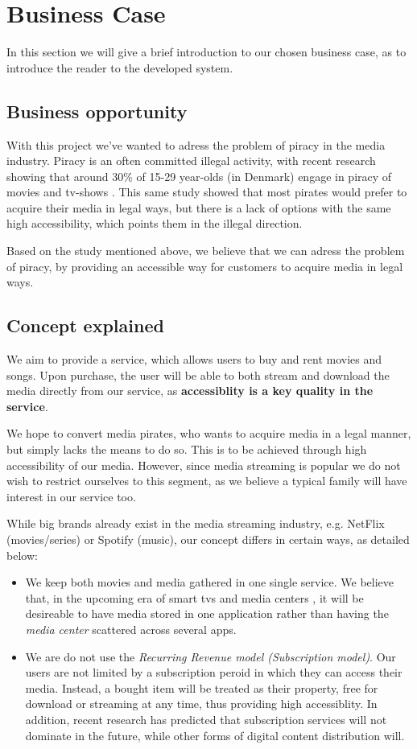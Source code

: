 \section{Business Case}
In this section we will give a brief introduction to our chosen business case, as to introduce the reader to the developed system.

\subsection{Business opportunity}
With this project we've wanted to adress the problem of piracy in the media industry. Piracy is an often committed illegal activity, with recent research showing that around 30\% of 15-29 year-olds (in Denmark) engage in piracy of movies and tv-shows \cite{pirates}. This same study showed that most pirates would prefer to acquire their media in legal ways, but there is a lack of options with the same high accessibility, which points them in the illegal direction.

Based on the study mentioned above, we believe that we can adress the problem of piracy, by providing an accessible way for customers to acquire media in legal ways.

\subsection{Concept explained}
We aim to provide a service, which allows users to buy and rent movies and songs. Upon purchase, the user will be able to both stream and download the media directly from our service, as \textbf{accessiblity is a key quality in the service}.

We hope to convert media pirates, who wants to acquire media in a legal manner, but simply lacks the means to do so. This is to be achieved through high accessibility of our media. However, since media streaming is popular\cite{ott} we do not wish to restrict ourselves to this segment, as we believe a typical  family will have interest in our service too.

While big brands already exist in the media streaming industry, e.g. NetFlix (movies/series) or Spotify (music), our concept differs in certain ways, as detailed below:

\begin{itemize}
\item We keep both movies and media gathered in one single service. We believe that, in the upcoming era of smart tvs and media centers \cite{smarttv}, it will be desireable to have media stored in one application rather than having the \emph{media center} scattered across several apps.
\item We are do not use the \emph{Recurring Revenue model (Subscription model)}\cite{businessmodel}. Our users are not limited by a subscription peroid in which they can access their media. Instead, a bought item will be treated as their property, free for download or streaming at any time, thus providing high accessiblity. In addition, recent research\cite{ott} has predicted that subscription services will not dominate in the future, while other forms of digital content distribution will.
\end{itemize}
